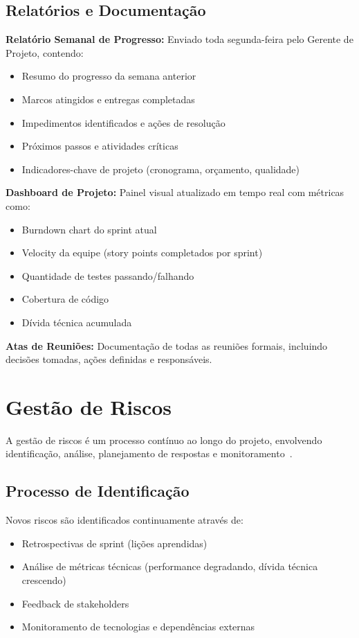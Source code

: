 \subsection{Relatórios e Documentação}

\textbf{Relatório Semanal de Progresso:} Enviado toda segunda-feira pelo Gerente de Projeto, contendo:
\begin{itemize}
    \item Resumo do progresso da semana anterior
    \item Marcos atingidos e entregas completadas
    \item Impedimentos identificados e ações de resolução
    \item Próximos passos e atividades críticas
    \item Indicadores-chave de projeto (cronograma, orçamento, qualidade)
\end{itemize}

\textbf{Dashboard de Projeto:} Painel visual atualizado em tempo real com métricas como:
\begin{itemize}
    \item Burndown chart do sprint atual
    \item Velocity da equipe (story points completados por sprint)
    \item Quantidade de testes passando/falhando
    \item Cobertura de código
    \item Dívida técnica acumulada
\end{itemize}

\textbf{Atas de Reuniões:} Documentação de todas as reuniões formais, incluindo decisões tomadas, ações definidas e responsáveis.

\section{Gestão de Riscos}

A gestão de riscos é um processo contínuo ao longo do projeto, envolvendo identificação, análise, planejamento de respostas e monitoramento~\cite{PMI:2021}.

\subsection{Processo de Identificação}

Novos riscos são identificados continuamente através de:
\begin{itemize}
    \item Retrospectivas de sprint (lições aprendidas)
    \item Análise de métricas técnicas (performance degradando, dívida técnica crescendo)
    \item Feedback de stakeholders
    \item Monitoramento de tecnologias e dependências externas
\end{itemize}

